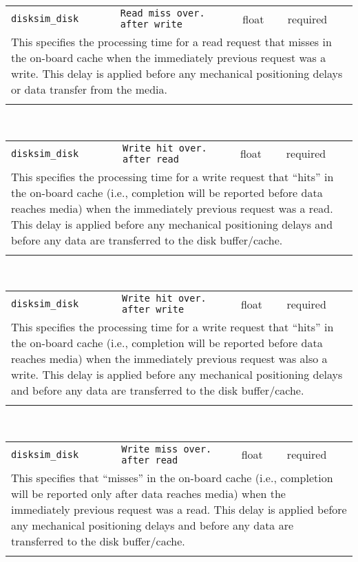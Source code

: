 \noindent 
\begin{tabular}{|p{1.5in}|p{3.5in}|p{0.5in}|p{0.5in}|}
\cline{1-4}
\texttt{disksim\_disk} & \texttt{Read miss over. after write} & float & required \\ 
\cline{1-4}
\multicolumn{4}{|p{6in}|}{
This specifies the processing time for a read request that misses in the
on-board cache when the immediately previous request was a write.
This delay is applied before any mechanical positioning delays or data
transfer from the media.
}\\ 
\cline{1-4}
\multicolumn{4}{p{5in}}{}\\
\end{tabular}\\ 
\noindent 
\begin{tabular}{|p{1.5in}|p{3.5in}|p{0.5in}|p{0.5in}|}
\cline{1-4}
\texttt{disksim\_disk} & \texttt{Write hit over. after read} & float & required \\ 
\cline{1-4}
\multicolumn{4}{|p{6in}|}{
This specifies the processing time for a write request that ``hits'' in
the on-board cache (i.e., completion will be reported before data
reaches media) when the immediately previous request was a read. This
delay is applied before any mechanical positioning delays and before
any data are transferred to the disk buffer/cache.
}\\ 
\cline{1-4}
\multicolumn{4}{p{5in}}{}\\
\end{tabular}\\ 
\noindent 
\begin{tabular}{|p{1.5in}|p{3.5in}|p{0.5in}|p{0.5in}|}
\cline{1-4}
\texttt{disksim\_disk} & \texttt{Write hit over. after write} & float & required \\ 
\cline{1-4}
\multicolumn{4}{|p{6in}|}{
This specifies the processing time for a write request that ``hits'' in
the on-board cache (i.e., completion will be reported before data
reaches media) when the immediately previous request was also a write.
This delay is applied before any mechanical positioning delays and
before any data are transferred to the disk buffer/cache.
}\\ 
\cline{1-4}
\multicolumn{4}{p{5in}}{}\\
\end{tabular}\\ 
\noindent 
\begin{tabular}{|p{1.5in}|p{3.5in}|p{0.5in}|p{0.5in}|}
\cline{1-4}
\texttt{disksim\_disk} & \texttt{Write miss over. after read} & float & required \\ 
\cline{1-4}
\multicolumn{4}{|p{6in}|}{
This specifies that ``misses'' in the on-board cache (i.e., completion will
be reported only after data reaches media) when the immediately
previous request was a read. This delay is applied before any
mechanical positioning delays and before any data are transferred to
the disk buffer/cache.
}\\ 
\cline{1-4}
\multicolumn{4}{p{5in}}{}\\
\end{tabular}\\ 
